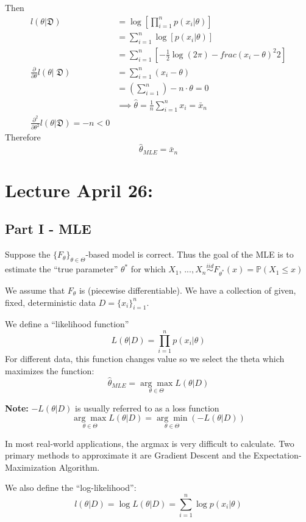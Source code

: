 \documentclass[12pt]{article}
\renewcommand{\P}{\mathbb{P}}
\begin{document}
Then 
\begin{align*}
    l(\theta | \mathfrak{D}) &= \log \left[\prod_{i=1}^n p(x_i | \theta)\right]\\
    &= \sum_{i=1}^n \log[p(x_i | \theta)]\\
    &= \sum_{i=1}^n \left[-\frac{1}{2}\log(2\pi) -frac{(x_i - \theta)^2}{2}\right]\\
    \frac{\partial}{\partial \theta} l(\theta | \; \mathfrak{D}) &= \sum_{i=1}^n (x_i - \theta)\\
    &= \left(\sum_{i=1}^n \right) - n \cdot \theta = 0\\
    &\implies \hat{\theta} = \frac{1}{n}\sum_{i=1}^n x_i = \bar{x}_n\\
    \frac{\partial^2}{\partial \theta^2} l(\theta | \mathfrak{D}) = -n < 0
\end{align*}
Therefore 
\[\boxed{\hat{\theta}_{MLE} = \bar{x}_n}\]

\section*{Lecture April 26:}
\subsection*{Part I - MLE}
Suppose the $\{F_\theta\}_{\theta \in \Theta}$-based model is correct. Thus the goal of the MLE is to estimate the ``true parameter'' $\theta^*$ for which $X_1, \, ..., X_n \overset{iid}{\sim} F_{\theta^*}(x) = \P(X_1 \leq x)$

We assume that $F_\theta$ is (piecewise differentiable). We have a collection of given, fixed, deterministic data $D = \{x_i\}_{i=1}^n$. 

We define a ``likelihood function''
\[L(\theta | D) = \prod_{i=1}^n p(x_i | \theta)\]
For different data, this function changes value so we select the theta which maximizes the function:
\[\hat{\theta}_{MLE} = \underset{\theta \in \Theta}{\arg \max} L(\theta | D)\]

\textbf{Note:} $-L(\theta | D)$ is usually referred to as a loss function 
\[\underset{\theta \in \Theta}{\arg \max} L(\theta | D) = \underset{\theta \in \Theta}{\arg \min} (-L(\theta | D))\]

In most real-world applications, the argmax is very difficult to calculate. Two primary methods to approximate it are Gradient Descent and the Expectation-Maximization Algorithm.

We also define the ``log-likelihood'':
\[l(\theta | D) = \log L(\theta | D) = \sum_{i=1}^n \log p(x_i | \theta)\]
\end{document}
